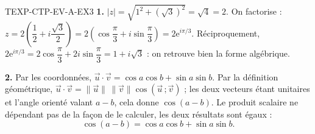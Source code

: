 \begin{corrige}{TEXP-CTP-EV-A-EX3}
\textbf{1.} $|z|=\sqrt{1^2+(\sqrt3)^2}=\sqrt4=2$. On factorise :
$z=2\left(\dfrac12+i\dfrac{\sqrt3}{2}\right)=2\left(\cos\dfrac{\pi}{3}+i\sin\dfrac{\pi}{3}\right)=2\mathrm{e}^{i\pi/3}$.
Réciproquement, $2\mathrm{e}^{i\pi/3}=2\cos\dfrac{\pi}{3}+2i\sin\dfrac{\pi}{3}=1+i\sqrt3$ : on retrouve bien la forme algébrique.

\textbf{2.} Par les coordonnées, $\vec u\cdot\vec v=\cos a\cos b+\sin a\sin b$.
Par la définition géométrique, $\vec u\cdot\vec v=\|\vec u\|\,\|\vec v\|\cos(\vec u\,;\vec v)$ ;
les deux vecteurs étant unitaires et l'angle orienté valant $a-b$, cela donne $\cos(a-b)$.
Le produit scalaire ne dépendant pas de la façon de le calculer, les deux résultats sont égaux :
\[
  \cos(a-b)=\cos a\cos b+\sin a\sin b .
\]
\end{corrige}
